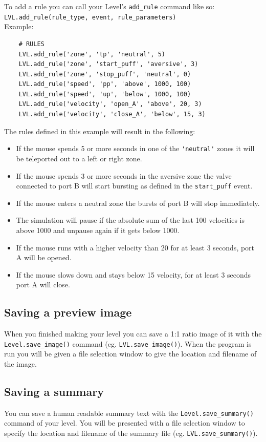 \documentclass[11pt,a4paper]{article}
\begin{document}
To add a rule you can call your Level's \texttt{add\_rule} command like so: \texttt{LVL.add\_rule(rule\_type, event, rule\_parameters)}\\


Example:
\begin{lstlisting}
	# RULES
	LVL.add_rule('zone', 'tp', 'neutral', 5)
	LVL.add_rule('zone', 'start_puff', 'aversive', 3)
	LVL.add_rule('zone', 'stop_puff', 'neutral', 0)
	LVL.add_rule('speed', 'pp', 'above', 1000, 100)
	LVL.add_rule('speed', 'up', 'below', 1000, 100)
	LVL.add_rule('velocity', 'open_A', 'above', 20, 3)
	LVL.add_rule('velocity', 'close_A', 'below', 15, 3)
\end{lstlisting}

The rules defined in this example will result in the following:
\begin{itemize}
\item If the mouse spends 5 or more seconds in one of the \lstinline{'neutral'} zones it will be teleported out to a left or right zone.
\item If the mouse spends 3 or more seconds in the aversive zone the valve connected to port B will start bursting as defined in the \texttt{start\_puff} event.
\item If the mouse enters a neutral zone the bursts of port B will stop immediately.
\item The simulation will pause if the absolute sum of the last 100 velocities is above 1000 and unpause again if it gets below 1000.
\item If the mouse runs with a higher velocity than 20 for at least 3 seconds, port A will be opened.
\item If the mouse slows down and stays below 15 velocity, for at least 3 seconds port A will close.
\end{itemize}

\subsection{Saving a preview image}
When you finished making your level you can save a 1:1 ratio image of it with the \texttt{Level.save\_image()} command (eg. \texttt{LVL.save\_image()}). When the program is run you will be given a file selection window to give the location and
filename of the image.

\subsection{Saving a summary}
You can save a human readable summary text with the \texttt{Level.save\_summary()} command of your level. You will be presented with a file selection window to specify the location and filename of the summary file (eg. \texttt{LVL.save\_summary()}).
\end{document}
